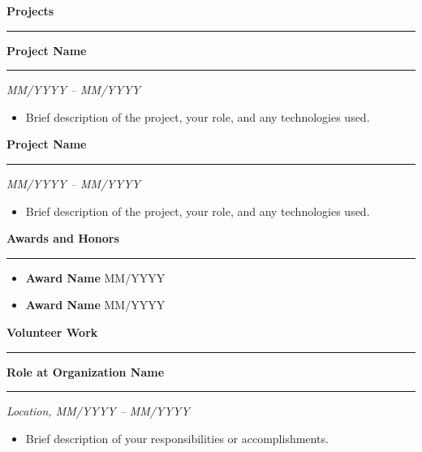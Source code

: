\documentclass[a4paper,10pt]{article}
\renewcommand{\section}[1]{\vspace{0.1in} \noindent \textbf{\LARGE \textcolor{myblue}{#1}} \vspace{0.05in} \hrule \vspace{0.05in}}
\renewcommand{\subsection}[1]{\vspace{0.1in} \noindent \textbf{\large \textcolor{myblue}{#1}} \vspace{0.05in} \hrule \vspace{0.05in}}
\begin{document}
\section{Projects}
\subsection{Project Name}
\textit{MM/YYYY -- MM/YYYY}
\begin{itemize}[left=0pt]
    \item Brief description of the project, your role, and any technologies used.
\end{itemize}

\subsection{Project Name}
\textit{MM/YYYY -- MM/YYYY}
\begin{itemize}[left=0pt]
    \item Brief description of the project, your role, and any technologies used.
\end{itemize}

\section{Awards and Honors}
\begin{itemize}[left=0pt]
    \item \textbf{Award Name} \hfill MM/YYYY
    \item \textbf{Award Name} \hfill MM/YYYY
\end{itemize}

\section{Volunteer Work}
\subsection{Role at Organization Name}
\textit{Location, MM/YYYY -- MM/YYYY}
\begin{itemize}[left=0pt]
    \item Brief description of your responsibilities or accomplishments.
\end{itemize}
\end{document}
